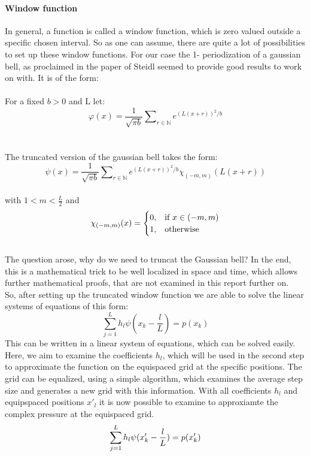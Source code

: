 \documentclass{article}
\begin{document}
\paragraph{Window function} $ $\\[1ex]
In general, a function is called a window function, which is zero valued outside a specific chosen interval. So as one can assume, there are quite a lot of possibilities to set up these window functions. For our case the 1- periodization of a gaussian bell, as proclaimed in the paper of Steidl seemed to provide good results to work on with. It is of the form: 
\\
\\
For a fixed $b>0$ and L let:
\begin{equation}
\varphi(x)= \frac{1}{\sqrt{\pi b}} \sum\nolimits_{r \in \mathbb{N}}  e^{(L(x+r))^2/b}
\end{equation}\\\\		
The truncated version of the gaussian bell takes the form: 
\begin{equation}
\psi(x)= \frac{1}{\sqrt{\pi b}} \sum\nolimits_{r \in \mathbb{N}}  e^{(L(x+r))^2/b}\chi_{(-m,m)}(L(x+r))
\end{equation}\\
with $1<m < \frac{L}{2}$ and
\begin{equation}
    \chi_{(-m,m)}(x)=
    \begin{cases}
      0, & \text{if}\ x\in (-m,m) \\
      1, & \text{otherwise}
    \end{cases}\notag
  \end{equation}\\ 
The question arose, why do we need to truncat the Gaussian bell? In the end, this is a mathematical trick to be well localized in space and time, which allows further mathematical proofs, that are not examined in this report further on. \\So, after setting up the truncated window function we are able to solve the linear systems of equations of this form:
\begin{equation}
\sum\limits_{j=1}^L h_{l}\psi(x_{k}-\frac{l}{L})=p(x_{k})
\end{equation}
This can be written in a linear system of equations, which can be solved easily. Here, we aim to examine the coefficients $h_{l}$, which will be used in the second step to approximate the function on the equispaced grid at the specific positions. The grid can be equalized, using a simple algorithm, which examines the average step size and generates a new grid with this information. With all coefficients $h_{l}$ and equipspaced positions $x'_{l}$ it is now possible to examine to approxiamte the complex pressure at the equispaced grid. 
\begin{equation}
 \sum\limits_{j=1}^L h_{l}\psi(x'_{k}-\frac{l}{L})=p(x'_{k})\notag
\end{equation}
\end{document}
